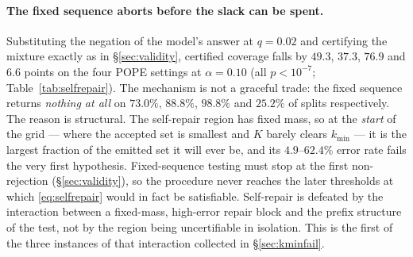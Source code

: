 \documentclass{article}
\theoremstyle{plain}
\theoremstyle{definition}
\theoremstyle{remark}
\begin{document}
\paragraph{The fixed sequence aborts before the slack can be spent.}
Substituting the negation of the model's answer at $q=0.02$ and certifying the mixture exactly
as in \S\ref{sec:validity}, certified coverage falls by $49.3$, $37.3$, $76.9$ and $6.6$ points
on the four POPE settings at $\alpha=0.10$ (all $p<10^{-7}$; Table~\ref{tab:selfrepair}). The
mechanism is not a graceful trade: the fixed sequence returns \emph{nothing at all} on
$73.0\%$, $88.8\%$, $98.8\%$ and $25.2\%$ of splits respectively. The reason is structural. The
self-repair region has fixed mass, so at the \emph{start} of the grid --- where the accepted set
is smallest and $K$ barely clears $k_{\min}$ --- it is the largest fraction of the emitted set
it will ever be, and its $4.9$--$62.4\%$ error rate fails the very first hypothesis.
Fixed-sequence testing must stop at the first non-rejection (\S\ref{sec:validity}), so the
procedure never reaches the later thresholds at which \eqref{eq:selfrepair} would in fact be
satisfiable. Self-repair is defeated by the interaction between a fixed-mass, high-error repair
block and the prefix structure of the test, not by the region being uncertifiable in isolation.
This is the first of the three instances of that interaction collected in
\S\ref{sec:kminfail}.
\end{document}
